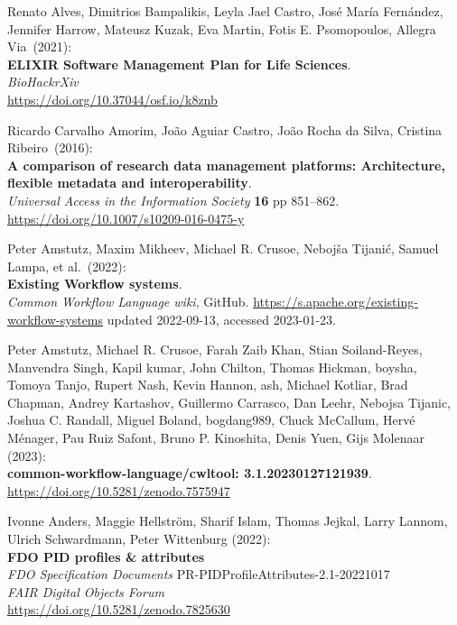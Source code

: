 \begin{thebibliography}{9}
Renato Alves, Dimitrios Bampalikis, Leyla Jael Castro,
José María Fernández, Jennifer Harrow, Mateusz Kuzak, Eva Martin, Fotis
E. Psomopoulos, Allegra Via~(2021):\\
\textbf{ELIXIR Software Management Plan for Life Sciences}.\\
\emph{BioHackrXiv}\\
\url{https://doi.org/10.37044/osf.io/k8znb}

Ricardo Carvalho Amorim, João Aguiar Castro, João Rocha da
Silva, Cristina Ribeiro~(2016):\\
\textbf{A comparison of research data management platforms:
Architecture, flexible metadata and interoperability}.\\
\emph{Universal Access in the Information Society} \textbf{16} pp
851--862.\\
\url{https://doi.org/10.1007/s10209-016-0475-y}

Peter Amstutz, Maxim Mikheev, Michael R. Crusoe, Nebojša Tijanić, Samuel Lampa, et al.~(2022):\\
\textbf{Existing Workflow systems}.\\
\emph{Common Workflow Language wiki}, GitHub. 
\url{https://s.apache.org/existing-workflow-systems} updated 2022-09-13, accessed 2023-01-23.

Peter Amstutz, Michael R. Crusoe, Farah Zaib Khan, Stian Soiland-Reyes, Manvendra Singh, Kapil kumar, John Chilton, Thomas Hickman, boysha, Tomoya Tanjo, Rupert Nash, Kevin Hannon, ash, Michael Kotliar, Brad Chapman, Andrey Kartashov, Guillermo Carrasco, Dan Leehr, Nebojsa Tijanic, Joshua C. Randall, Miguel Boland, bogdang989, Chuck McCallum, Hervé Ménager, Pau Ruiz Safont, Bruno P. Kinoshita, Denis Yuen, Gijs Molenaar (2023):\\
\textbf{common-workflow-language/cwltool: 3.1.20230127121939}.\\
\url{https://doi.org/10.5281/zenodo.7575947}

Ivonne Anders, Maggie Hellström, Sharif Islam, Thomas Jejkal, Larry
Lannom, Ulrich Schwardmann, Peter Wittenburg (2022): \\
\textbf{{FDO PID} profiles \& attributes} \\
\emph{FDO Specification Documents} PR-PIDProfileAttributes-2.1-20221017 \\
\emph{FAIR Digital Objects Forum}\\
\url{https://doi.org/10.5281/zenodo.7825630}


\end{thebibliography}
